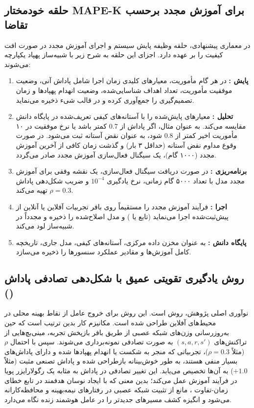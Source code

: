 \documentclass[oneside,openany,a4paper,12pt]{article}
\begin{document}
\subsection{حلقه خودمختار MAPE-K برای آموزش مجدد برحسب تقاضا}
در معماری پیشنهادی، حلقه  وظیفه پایش سیستم و اجرای آموزش مجدد در صورت افت کیفیت را بر عهده دارد. اجزای این حلقه به شرح زیر با شبیه‌ساز پهپاد یکپارچه می‌شوند:
\begin{enumerate}
    \item \textbf{پایش :} در هر گام مأموریت، معیارهای کلیدی زمان اجرا شامل پاداش آنی، وضعیت موفقیت مأموریت، تعداد اهداف شناسایی‌شده، وضعیت انهدام پهپادها و زمان تصمیم‌گیری را جمع‌آوری کرده و در قالب شیء  ذخیره می‌نماید.
    \item \textbf{تحلیل :} معیارهای پایش‌شده را با آستانه‌های کیفی تعریف‌شده در پایگاه دانش مقایسه می‌کند. به عنوان مثال، اگر پاداش از $0.7$ کمتر باشد یا نرخ موفقیت در ۱۰ مأموریت اخیر کمتر از $0.8$ شود، به عنوان نقض آستانه ثبت می‌شود. در صورت وقوع مداوم نقض آستانه (حداقل ۳ بار) و گذشت زمان کافی از آخرین آموزش مجدد (۱۰۰۰ گام)، یک سیگنال فعال‌سازی آموزش مجدد صادر می‌گردد.
    \item \textbf{برنامه‌ریزی :} در صورت دریافت سیگنال فعال‌سازی، یک نقشه وفقی  برای آموزش مجدد مدل با تعداد ۵۰۰۰ گام زمانی، نرخ یادگیری $10^{-4}$ و ضریب شکل‌دهی پاداش $\rho = 0.3$ تهیه می‌کند.
    \item \textbf{اجرا :} فرآیند آموزش مجدد را مستقیماً روی بافر تجربیات آفلاین یا آنلاین از پیش‌ثبت‌شده اجرا می‌نماید (تابع  یا ) و مدل اصلاح‌شده را ذخیره و مجدداً در شبیه‌ساز لود می‌کند.
    \item \textbf{پایگاه دانش :} به عنوان مخزن داده مرکزی، آستانه‌های کیفی، مدل جاری، تاریخچه کامل آموزش‌ها و مقادیر عملکرد سنسورها را ذخیره می‌سازد.
\end{enumerate}

\subsection{روش یادگیری تقویتی عمیق با شکل‌دهی تصادفی پاداش ()}
نوآوری اصلی پژوهش، روش  است. این روش برای خروج عامل از نقاط بهینه محلی در محیط‌های آفلاین طراحی شده است. مکانیزم کار بدین ترتیب است که حین به‌روزرسانی وزن‌های شبکه عصبی  از طریق بافر بازپخش تجربه، مینی‌بچ‌هایی از تراکنش‌های $(s, a, r, s')$ به صورت تصادفی نمونه‌برداری می‌شوند. سپس با احتمال $\rho$ (مثلاً $\rho=0.3$)، تجربیاتی که منجر به شکست یا انهدام پهپادها شده و دارای پاداش‌های بسیار منفی هستند، به طور خوش‌بینانه بازطراحی شده و پاداش تصنعی مثبت (مثلاً $+1.0$) به آن‌ها تخصیص می‌یابد. این تغییر تصادفی در پاداش به مثابه یک رگولارایزر پویا در فرآیند آموزش عمل می‌کند؛ بدین معنی که با ایجاد نوسان هدفمند در تابع خطای زمان-تفاوت ، مانع از تثبیت شبکه عصبی در رفتارهای نیمه‌بهینه و محافظه‌کارانه می‌شود و انگیزه کشف مسیرهای جدیدتر را در عامل هوشمند زنده نگاه می‌دارد.
\end{document}
